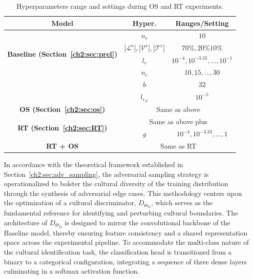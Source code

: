 \begin{table}
\footnotesize
\centering
\setlength{\tabcolsep}{0.1cm}
\renewcommand{\arraystretch}{1.5}
\centering
\begin{tabular}{c|c|c}
\toprule
\textbf{Model} & \textbf{Hyper.} & \textbf{Ranges/Setting} \\
\midrule
\multirow{4}{*}{\textbf{Baseline (Section~\ref{ch2:sec:prel})}} & $n_r$ & $10$ \\
\hhline{~--}
& $|\mathcal{L}^r|, |\mathcal{V}^r|, |\mathcal{T}^r|$& $70\%, 20\% 10\%$ \\
\hhline{~--}
& $l_r$ & $10^{-4}, 10^{-3.33}, \dots, 10^{-1}$\\
\hhline{~--}
& $n_e$ & $10, 15, \dots, 30$\\
\hhline{~--}
& $b$ & $32$\\
\hhline{~--}
& $l_{r_{ft}}$ & $10^{-5}$\\
\midrule
\textbf{OS (Section~\ref{ch2:sec:os})} & \multicolumn{2}{c}{Same as above}\\
\midrule
\multirow{2}{*}{\textbf{RT (Section~\ref{ch2:sec:RT})}} & \multicolumn{2}{c}{Same as above plus}\\
\hhline{~--}
 & $g$ &  $10^{-4}, 10^{-3.33}, \dots, 1$\\
\midrule
\textbf{\textbf{RT + OS}} & \multicolumn{2}{c}{Same as RT}\\
\bottomrule
\end{tabular}
\caption{Hyperparameters range and settings during OS and RT experiments.}
\label{ch3:tab:hyper:os_rt}
\end{table}
%
In accordance with the theoretical framework established in Section~\ref{ch2:sec:adv_sampling}, the adversarial sampling strategy is operationalized to bolster the cultural diversity of the training distribution through the synthesis of adversarial edge cases. 
This methodology centers upon the optimization of a cultural discriminator, $D_{\Theta_D}$, which serves as the fundamental reference for identifying and perturbing cultural boundaries.
The architecture of $D_{\Theta_D}$ is designed to mirror the convolutional backbone of the Baseline model, thereby ensuring feature consistency and a shared representation space across the experimental pipeline. 
To accommodate the multi-class nature of the cultural identification task, the classification head is transitioned from a binary to a categorical configuration, integrating a sequence of three dense layers culminating in a softmax activation function.

